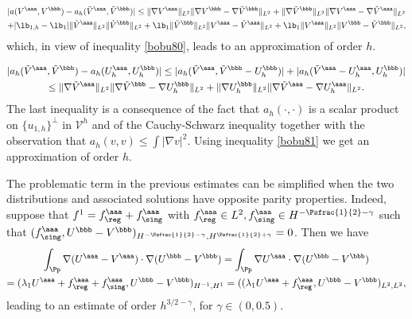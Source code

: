 \vspace*{-1.8\baselineskip}
\begin{multline*}
|a(V^\aaa,V^\bbb)-a_h(\tilde V^\aaa, \tilde V^\bbb)| \le \|\nabla V^\aaa\|_{L^2} \|\nabla V^\bbb-\nabla \tilde V^\bbb\|_{L^2}+ \|\nabla \tilde V^\bbb\|_{L^2} \|\nabla V^\aaa-\nabla \tilde V^\aaa\|_{L^2}\\
+
|\lb_{1,h}-\lb_1| \|\tilde V^\aaa\|_{L^2}\|\tilde V^\bbb\|_{L^2}+ \lb_1 \|\tilde V^\bbb\|_{L^2} \| V^\aaa- \tilde V^\aaa\|_{L^2}+\lb_1 \|V^\aaa\|_{L^2} \| V^\bbb-\tilde V^\bbb\|_{L^2},
\end{multline*}
which, in view of inequality \eqref{bobu80}, leads to an approximation of order $h$.

\vspace*{-1.5\baselineskip}
\begin{multline*}
|a_h(\tilde V^\aaa, \tilde V^\bbb)-a_h(U_h^\aaa, U_h^\bbb)|\le |a_h(\tilde V^\aaa, \tilde V^\bbb-U^\bbb_h)|+ |a_h(\tilde V^\aaa-U^\aaa_h, U_h^\bbb)|\\
\le
\|\nabla \tilde V^\aaa\|_{L^2} \|\nabla \tilde V^\bbb-\nabla U^\bbb_h\|_{L^2}+ \|\nabla U^\bbb_h\|_{L^2} \|\nabla \tilde V^\aaa-\nabla U^\aaa_h\|_{L^2}.
\end{multline*}
The last inequality is a consequence of the fact that $a_h(\cdot, \cdot)$ is a scalar product on $\{u_{1,h}\}^\perp$ in ${\mathcal V}^h$ and of the Cauchy-Schwarz inequality together with the observation that $a_h(v,v) \le \int |\nabla v|^2$.
Using inequality \eqref{bobu81} we get an approximation of order $h$.

\begin{rem}
The problematic term in the previous estimates can be simplified when the two distributions and associated solutions have opposite parity properties. Indeed, suppose that $f^1 = f^\aaa_{\reg}+f^\aaa_{\sing}$ with $f^\aaa_{\reg} \in L^2, f^\aaa_{\sing} \in H^{-\Psfrac{1}{2}-\gamma}$ such that $(f^\aaa_{\sing},U^\bbb-V^\bbb)_{H^{-\Psfrac{1}{2}-\gamma},H^{\Psfrac{1}{2}+\gamma}} = 0$. Then we have
\vspace*{-5pt}
\begin{multline*}
\int_\Pp \nabla (U^\aaa-V^\aaa)\cdot \nabla (U^\bbb-V^\bbb) = \int_\Pp \nabla U^\aaa \cdot \nabla (U^\bbb-V^\bbb) \\
=  (\lambda_1U^\aaa+f^\aaa_{\reg}+f^\aaa_{\sing},U^\bbb-V^\bbb)_{H^{-1},H^1} = ((\lambda_1U^\aaa+f^\aaa_{\reg},U^\bbb-V^\bbb)_{L^2,L^2},
\end{multline*}
leading to an estimate of order $h^{3/2-\gamma}$, for $\gamma \in (0,0.5)$.
\label{rem:zero-singular-part}
\end{rem}

